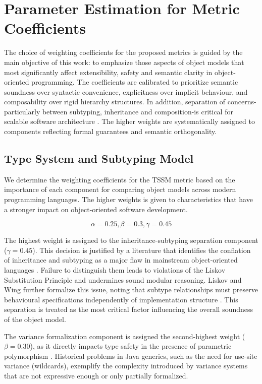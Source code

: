 \section{Parameter Estimation for Metric Coefficients}

The choice of weighting coefficients for the proposed metrics is guided by the main objective of this work: to emphasize those aspects of object models that most significantly affect extensibility, safety and semantic clarity in object-oriented programming. The coefficients are calibrated to prioritize semantic soundness over syntactic convenience, explicitness over implicit behaviour, and composability over rigid hierarchy structures. In addition, separation of concerns-particularly between subtyping, inheritance and composition-is critical for scalable software architecture \cite{odersky2004overview, cook1989inheritance}. The higher weights are systematically assigned to components reflecting formal guarantees and semantic orthogonality.

\subsection{Type System and Subtyping Model}

We determine the weighting coefficients for the TSSM metric based on the importance of each component for comparing object models across modern programming languages. The higher weights is given to characteristics that have a stronger impact on object-oriented software development.

\[
    \alpha = 0.25, \beta = 0.3, \gamma = 0.45
\]

The highest weight is assigned to the inheritance-subtyping separation component ($\gamma = 0.45$).  This decision is justified by a literature that identifies the conflation of inheritance and subtyping as a major flaw in mainstream object-oriented languages \cite{cook1989inheritance}. Failure to distinguish them leads to violations of the Liskov Substitution Principle and undermines sound modular reasoning. Liskov and Wing further formalize this issue, noting that subtype relationships must preserve behavioural specifications independently of implementation structure \cite{liskov1999behavioral}. This separation is treated as the most critical factor influencing the overall soundness of the object model.

The variance formalization component is assigned the second-highest weight ($\beta = 0.30$), as it directly impacts type safety in the presence of parametric polymorphism  \cite{pierce2002types}. Historical problems in Java generics, such as the need for use-site variance (wildcards), exemplify the complexity introduced by variance systems that are not expressive enough or only partially formalized.  

